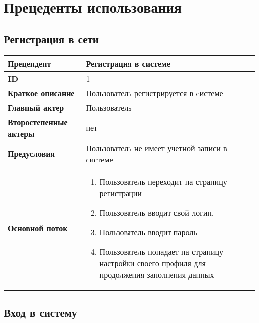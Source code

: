 \section{Прецеденты использования}
\subsection{Регистрация в сети}
\begin{tabular}{|l|p{9cm}|}
  \hline
  \textbf{Прецендент}            & Регистрация в системе                                                                             \\
  \hline
  \textbf{ID}                    & 1                                                                                                 \\
  \hline
  \textbf{Краткое описание}      & Пользователь регистрируется в cистеме                                                             \\
  \hline
  \textbf{Главный актер}         & Пользователь                                                                                      \\
  \hline
  \textbf{Второстепенные актеры} & нет                                                                                               \\
  \hline
  \textbf{Предусловия}           & Пользователь не имеет учетной записи в системе                                                    \\
  \hline
  \textbf{Основной поток}        & \begin{enumerate}
                                     \item Пользователь переходит на страницу регистрации
                                     \item Пользователь вводит свой логин.
                                     \item Пользователь вводит пароль
                                     \item Пользователь попадает на страницу настройки своего профиля для продолжения заполнения данных
                                   \end{enumerate} \\
  \hline
\end{tabular}

\subsection{Вход в систему}

